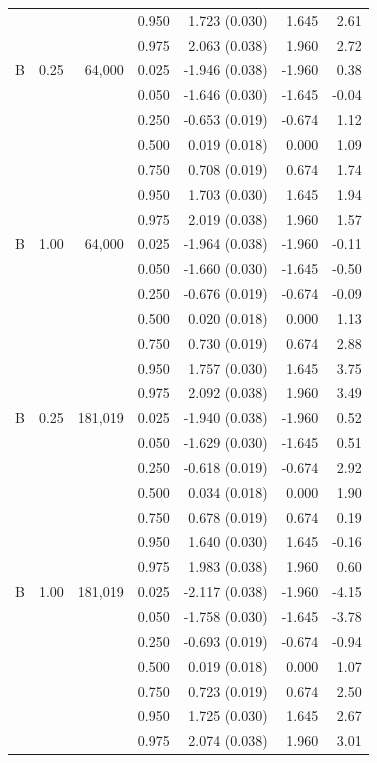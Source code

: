 \begin{tabular}{lrrrrrr}
 &  &  & 0.950 & 1.723 (0.030) & 1.645 & 2.61 \\
 &  &  & 0.975 & 2.063 (0.038) & 1.960 & 2.72 \\
\addlinespace
B & 0.25 & 64,000 & 0.025 & -1.946 (0.038) & -1.960 & 0.38 \\
 &  &  & 0.050 & -1.646 (0.030) & -1.645 & -0.04 \\
 &  &  & 0.250 & -0.653 (0.019) & -0.674 & 1.12 \\
 &  &  & 0.500 & 0.019 (0.018) & 0.000 & 1.09 \\
 &  &  & 0.750 & 0.708 (0.019) & 0.674 & 1.74 \\
 &  &  & 0.950 & 1.703 (0.030) & 1.645 & 1.94 \\
 &  &  & 0.975 & 2.019 (0.038) & 1.960 & 1.57 \\
\addlinespace
B & 1.00 & 64,000 & 0.025 & -1.964 (0.038) & -1.960 & -0.11 \\
 &  &  & 0.050 & -1.660 (0.030) & -1.645 & -0.50 \\
 &  &  & 0.250 & -0.676 (0.019) & -0.674 & -0.09 \\
 &  &  & 0.500 & 0.020 (0.018) & 0.000 & 1.13 \\
 &  &  & 0.750 & 0.730 (0.019) & 0.674 & 2.88 \\
 &  &  & 0.950 & 1.757 (0.030) & 1.645 & 3.75 \\
 &  &  & 0.975 & 2.092 (0.038) & 1.960 & 3.49 \\
\addlinespace
B & 0.25 & 181,019 & 0.025 & -1.940 (0.038) & -1.960 & 0.52 \\
 &  &  & 0.050 & -1.629 (0.030) & -1.645 & 0.51 \\
 &  &  & 0.250 & -0.618 (0.019) & -0.674 & 2.92 \\
 &  &  & 0.500 & 0.034 (0.018) & 0.000 & 1.90 \\
 &  &  & 0.750 & 0.678 (0.019) & 0.674 & 0.19 \\
 &  &  & 0.950 & 1.640 (0.030) & 1.645 & -0.16 \\
 &  &  & 0.975 & 1.983 (0.038) & 1.960 & 0.60 \\
\addlinespace
B & 1.00 & 181,019 & 0.025 & -2.117 (0.038) & -1.960 & -4.15 \\
 &  &  & 0.050 & -1.758 (0.030) & -1.645 & -3.78 \\
 &  &  & 0.250 & -0.693 (0.019) & -0.674 & -0.94 \\
 &  &  & 0.500 & 0.019 (0.018) & 0.000 & 1.07 \\
 &  &  & 0.750 & 0.723 (0.019) & 0.674 & 2.50 \\
 &  &  & 0.950 & 1.725 (0.030) & 1.645 & 2.67 \\
 &  &  & 0.975 & 2.074 (0.038) & 1.960 & 3.01 \\
\bottomrule
\end{tabular}
